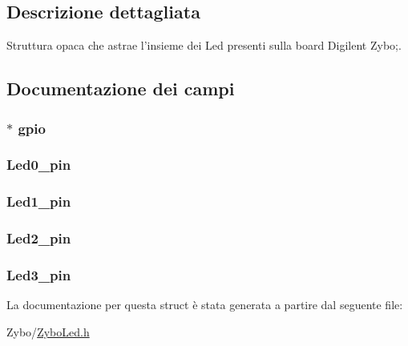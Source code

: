 \subsection{Descrizione dettagliata}
Struttura opaca che astrae l'insieme dei Led presenti sulla board Digilent Zybo;. 

\subsection{Documentazione dei campi}
\hypertarget{struct_zybo_led__t_acb3116190992a4d8d26545c103304d27}{
\subsubsection[{gpio}]{$\ast$ gpio}}\label{struct_zybo_led__t_acb3116190992a4d8d26545c103304d27}
\hypertarget{struct_zybo_led__t_aa4d077e557e43132a3100ab30b60165c}{
\subsubsection[{Led0\+\_\+pin}]{ Led0\+\_\+pin}}\label{struct_zybo_led__t_aa4d077e557e43132a3100ab30b60165c}
\hypertarget{struct_zybo_led__t_a2ee8b92c08972eb1b5bb1b72f4a9d305}{
\subsubsection[{Led1\+\_\+pin}]{ Led1\+\_\+pin}}\label{struct_zybo_led__t_a2ee8b92c08972eb1b5bb1b72f4a9d305}
\hypertarget{struct_zybo_led__t_a566ca7784af030de3be9244c99066a5c}{
\subsubsection[{Led2\+\_\+pin}]{ Led2\+\_\+pin}}\label{struct_zybo_led__t_a566ca7784af030de3be9244c99066a5c}
\hypertarget{struct_zybo_led__t_a85b108a2f134972366da967a9489068f}{
\subsubsection[{Led3\+\_\+pin}]{ Led3\+\_\+pin}}\label{struct_zybo_led__t_a85b108a2f134972366da967a9489068f}


La documentazione per questa struct è stata generata a partire dal seguente file\+:\begin{DoxyCompactItemize}
\item 
Zybo/\hyperlink{_zybo_led_8h}{Zybo\+Led.\+h}\end{DoxyCompactItemize}
